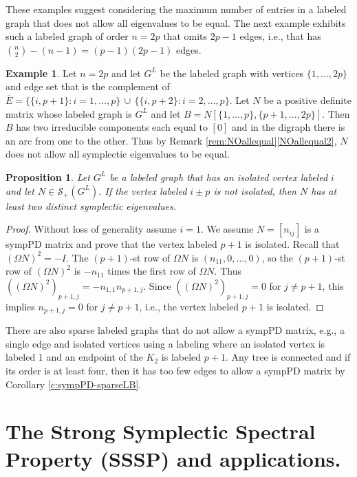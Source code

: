 \documentclass[12pt]{article}
\newtheorem{prop}[thm]{Proposition}
\theoremstyle{definition}
\theoremstyle{definition}
\theoremstyle{definition}
\newtheorem{ex}[thm]{Example}
\numberwithin{figure}{section}
\numberwithin{equation}{section}
\newcommand{\symp}{\mathcal{S}_+}
\newcommand{\bpf}{\begin{proof}}
\newcommand{\epf}{\end{proof}\ms}
\newcommand{\ms}{\medskip}
\newcommand{\OL}{\overline}
\begin{document}
These examples suggest considering the maximum number of entries in a labeled graph that does not allow all eigenvalues to be equal.  The next example exhibits such a labeled graph of order $n=2p$ 
that omits $2p-1$ edges, i.e., that has $\binom{n}{2}-(n-1)=(p-1)(2p-1)$ edges.


\begin{ex}
\rm 
    Let $n=2p$ and let $G^L$ be the labeled graph with vertices $\{1,\dots,2p\}$ and edge set that is the complement of $\OL E=\{\{i,p+1\}\colon i=1,\dots,p\}\,\cup\,
    {\{\{i,p+2\}\colon i=2,\dots,p\}}$.  Let $N$ be a positive definite matrix whose labeled graph is $G^L$ and let $B=N[\{1,\dots,p\}, \{p+1,\dots,2p\}]$.  Then $B$ has two irreducible components 
each equal to $[0]$  and in the digraph there is an arc from one to the other.  Thus by Remark \ref{rem:NOallequal}\eqref{NOallequal2}, $N$ does not allow all symplectic eigenvalues to be equal.
\end{ex}

\begin{prop}\label{iso-isol}
    Let $G^L$ be a labeled graph that has an isolated vertex labeled $i$ and let $N\in\symp(G^L)$.  If the vertex labeled $i\pm p$ is not isolated, then $N$ has at least two distinct symplectic eigenvalues. 
\end{prop}
\bpf Without loss of generality assume $i=1$. We assume  $N=[n_{ij}]$ is a sympPD matrix and prove that  the vertex labeled $p+1$ is isolated.
  Recall that $(\Omega N)^2=-I$. The $(p+1)$-st row of $\Omega N$ is $(n_{11},0,\dots,0)$, so the $(p+1)$-st  row of $(\Omega N)^2$ is $-n_{11}$ times the first row of $\Omega N$. Thus $((\Omega N)^2)_{p+1,j}=-n_{1,1} n_{p+1,j}$. Since $((\Omega N)^2)_{p+1,j}=0$ for $j\ne p+1$, this implies $n_{p+1,j}=0$ for $j\ne p+1$, i.e., the vertex labeled $p+1$ is isolated.  
\epf


 There are also sparse 
labeled graphs that do not allow a sympPD matrix, e.g., a single edge and isolated vertices using a labeling where an isolated vertex is labeled 1 and an endpoint of the $K_2$ is labeled $p+1$.  Any tree is connected and if its order is at least four, then it has too few edges  {to allow a sympPD matrix} by Corollary \ref{c:sympPD-sparseLB}.


\section{The Strong Symplectic Spectral Property (SSSP) and applications. }\label{s:strong} 
\end{document}
